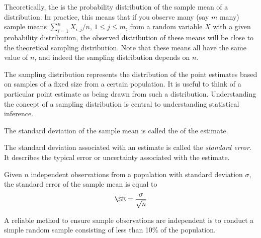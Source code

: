 Theoretically, the  is the probability distribution of the sample mean of a distribution. In practice, this means that if you observe many (say $m$ many) sample means $\sum_{i=1}^n X_{i,j}/n$, $1\le j\le m$, from a random variable $X$ with a given probability distribution, the observed distribution of these means will be close to the theoretical sampling distribution. Note that these means all have the same value of $n$, and indeed the sampling distribution depends on $n$.

\begin{termBox}{
The sampling distribution represents the distribution of the point estimates based on samples of a fixed size from a certain population. It is useful to think of a particular point estimate as being drawn from such a distribution. Understanding the concept of a sampling distribution is central to understanding statistical inference.}
\end{termBox}

The standard deviation of the sample mean is called the  of the estimate.

\begin{termBox}{
The standard deviation associated with an estimate is called the \emph{standard error}. It describes the typical error or uncertainty associated with the estimate.}
\end{termBox}




\begin{termBox}{
Given $n$ independent observations from a population with standard deviation $\sigma$, the standard error of the sample mean is equal to \vspace{-1mm}
\begin{eqnarray}
\SE = \frac{\sigma}{\sqrt{n}}
\label{seOfXBar}
\end{eqnarray}\vspace{-3mm}%

A reliable method to ensure sample observations are independent is to conduct a simple random sample consisting of less than 10\% of the population.
}
\end{termBox}


